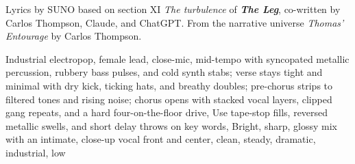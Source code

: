 
\begin{notes}
Lyrics by SUNO based on section XI \emph{The turbulence} of \emph{\bfseries The Leg}, %
co-written by Carlos Thompson, Claude, and ChatGPT. %
From the narrative universe \emph{Thomas’ Entourage} by Carlos Thompson.
\end{notes}
\begin{style}
Industrial electropop, female lead, close-mic, mid-tempo with syncopated metallic percussion, rubbery bass pulses, and cold synth stabs; verse stays tight and minimal with dry kick, ticking hats, and breathy doubles; pre-chorus strips to filtered tones and rising noise; chorus opens with stacked vocal layers, clipped gang repeats, and a hard four-on-the-floor drive, Use tape-stop fills, reversed metallic swells, and short delay throws on key words, Bright, sharp, glossy mix with an intimate, close-up vocal front and center, clean, steady, dramatic, industrial, low
\end{style}
